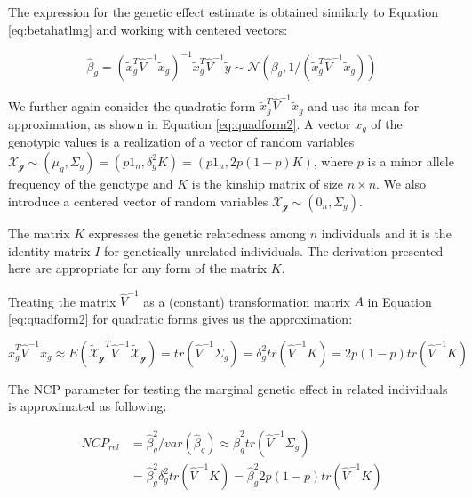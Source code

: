 \documentclass[]{book}
\begin{document}
The expression for the genetic effect estimate is obtained similarly to
Equation \eqref{eq:betahatlmg} and working with centered vectors:

\begin{equation}
  \hat{\beta}_g  = (\tilde{x}_g^T \hat{V}^{-1} \tilde{x}_g)^{-1} \tilde{x}_g^T \hat{V}^{-1} \tilde{y} \sim \mathcal{N} (\beta_g, 1 / (\tilde{x}_g^T \hat{V}^{-1} \tilde{x}_g))
\label{eq:betahatlmmg}
\end{equation}

We further again consider the quadratic form
\(\tilde{x}_g^T \hat{V}^{-1} \tilde{x}_g\) and use its mean for
approximation, as shown in Equation \eqref{eq:quadform2}. A vector \(x_g\)
of the genotypic values is a realization of a vector of random variables
\(\mathcal{X_g} \sim (\mu_g, \Sigma_g) = (p 1_n, \delta_g^2 K) = (p 1_n, 2 p (1 - p) K)\),
where \(p\) is a minor allele frequency of the genotype and \(K\) is the
kinship matrix of size \(n \times n\). We also introduce a centered
vector of random variables \(\mathcal{X_g} \sim (0_n, \Sigma_g)\).

The matrix \(K\) expresses the genetic relatedness among \(n\)
individuals and it is the identity matrix \(I\) for genetically
unrelated individuals. The derivation presented here are appropriate for
any form of the matrix \(K\).

Treating the matrix \(\hat{V}^{-1}\) as a (constant) transformation
matrix \(A\) in Equation \eqref{eq:quadform2} for quadratic forms gives us
the approximation:

\begin{equation}
\tilde{x}_g^T \hat{V}^{-1} \tilde{x}_g \approx E(\mathcal{\tilde{X}_g}^T \hat{V}^{-1} \mathcal{\tilde{X}_g}) = tr(\hat{V}^{-1} \Sigma_g) = \delta_g^2 tr(\hat{V}^{-1} K) = 2 p (1 - p) tr(\hat{V}^{-1} K)
\label{eq:varbetahatlmmg}
\end{equation}

The NCP parameter for testing the marginal genetic effect in related
individuals is approximated as following:

\begin{equation}
\begin{split}
NCP_{rel} & = \hat{\beta}_g^2 / var(\hat{\beta}_g) \approx \hat{\beta}_g^2 tr(\hat{V}^{-1} \Sigma_g) \\
 & = \hat{\beta}_g^2 \delta_g^2 tr(\hat{V}^{-1} K) = \hat{\beta}_g^2 2 p (1 - p) tr(\hat{V}^{-1} K)
\end{split}
\label{eq:ncplmg}
\end{equation}
\end{document}
